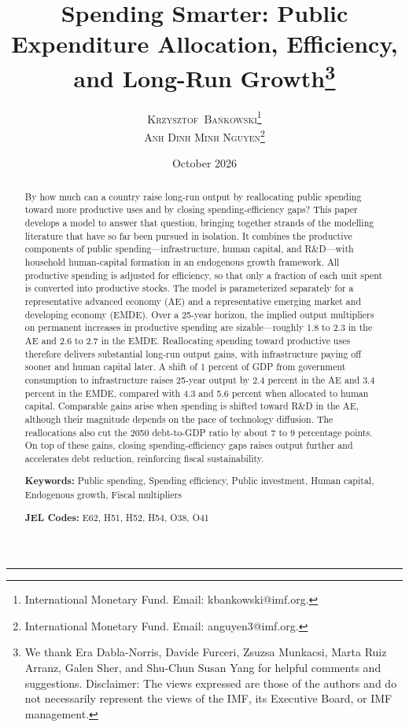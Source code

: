 \documentclass[a4paper,11pt]{article}
\title{\texorpdfstring{\vspace{-15mm}\fontsize{20pt}{24pt}\selectfont\textbf{Spending Smarter: Public Expenditure Allocation, Efficiency, and Long-Run Growth}\thanks{We thank Era Dabla-Norris, Davide Furceri, Zsuzsa Munkacsi, Marta Ruiz Arranz, Galen Sher, and Shu-Chun Susan Yang for helpful comments and suggestions. Disclaimer: The views expressed are those of the authors and do not necessarily represent the views of the IMF, its Executive Board, or IMF management.}%
  }{Spending Smarter: Public Expenditure Allocation, Efficiency, and Long-Run Growth}}
\author{
\large {\textsc{\texorpdfstring{Krzysztof~Ba\'nkowski}{Krzysztof Bankowski}\footnote{International Monetary Fund. Email: kbankowski@imf.org.}}}\\[2mm]
{\textsc{\texorpdfstring{Anh Dinh Minh Nguyen}{Anh Dinh Minh Nguyen}\footnote{International Monetary Fund. Email: anguyen3@imf.org.}}}\\[2mm]
}
\date{October 2026}
\begin{document}
\maketitle %

\begin{center}
    \vspace{-6mm}
    \textcolor{linkcol}{\rule{0.32\textwidth}{1pt}}
\end{center}

\begin{abstract}
By how much can a country raise long-run output by reallocating public spending toward more productive uses and by closing spending-efficiency gaps?
This paper develops a model to answer that question, bringing together strands of the modelling literature that have so far been pursued in isolation.
It combines the productive components of public spending---infrastructure, human capital, and R\&D---with household human-capital formation in an endogenous growth framework.
All productive spending is adjusted for efficiency, so that only a fraction of each unit spent is converted into productive stocks.
The model is parameterized separately for a representative advanced economy (AE) and a representative emerging market and developing economy (EMDE).
Over a 25-year horizon, the implied output multipliers on permanent increases in productive spending are sizable---roughly 1.8 to 2.3 in the AE and 2.6 to 2.7 in the EMDE.
Reallocating spending toward productive uses therefore delivers substantial long-run output gains, with infrastructure paying off sooner and human capital later. 
A shift of 1 percent of GDP from government consumption to infrastructure raises 25-year output by 2.4 percent in the AE and 3.4 percent in the EMDE, compared with 4.3 and 5.6 percent when allocated to human capital.
Comparable gains arise when spending is shifted toward R\&D in the AE, although their magnitude depends on the pace of technology diffusion.
The reallocations also cut the 2050 debt-to-GDP ratio by about 7 to 9 percentage points.
On top of these gains, closing spending-efficiency gaps raises output further and accelerates debt reduction, reinforcing fiscal sustainability.
\bigskip



\noindent\textbf{Keywords:} Public spending, Spending efficiency, Public investment, Human capital, Endogenous growth, Fiscal multipliers

\bigskip

\noindent\textbf{JEL Codes:} E62, H51, H52, H54, O38, O41


\end{abstract}
\end{document}
